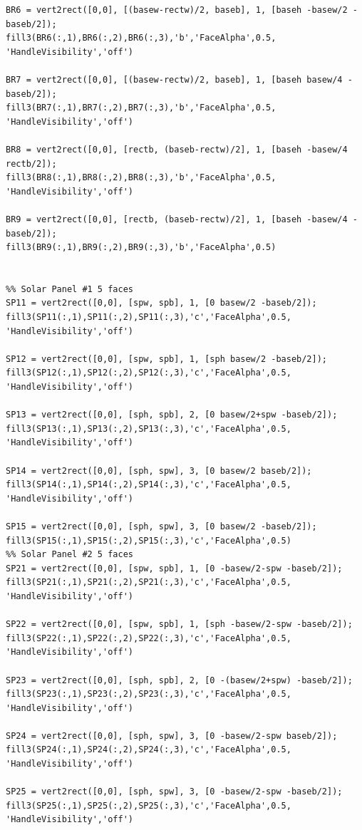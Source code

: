 \documentclass[12pt,a4paper,notitlepage]{article}
\begin{document}
\begin{lstlisting}
BR6 = vert2rect([0,0], [(basew-rectw)/2, baseb], 1, [baseh -basew/2 -baseb/2]);
fill3(BR6(:,1),BR6(:,2),BR6(:,3),'b','FaceAlpha',0.5,
'HandleVisibility','off')

BR7 = vert2rect([0,0], [(basew-rectw)/2, baseb], 1, [baseh basew/4 -baseb/2]);
fill3(BR7(:,1),BR7(:,2),BR7(:,3),'b','FaceAlpha',0.5,
'HandleVisibility','off')

BR8 = vert2rect([0,0], [rectb, (baseb-rectw)/2], 1, [baseh -basew/4 rectb/2]);
fill3(BR8(:,1),BR8(:,2),BR8(:,3),'b','FaceAlpha',0.5,
'HandleVisibility','off')

BR9 = vert2rect([0,0], [rectb, (baseb-rectw)/2], 1, [baseh -basew/4 -baseb/2]);
fill3(BR9(:,1),BR9(:,2),BR9(:,3),'b','FaceAlpha',0.5)


%% Solar Panel #1 5 faces
SP11 = vert2rect([0,0], [spw, spb], 1, [0 basew/2 -baseb/2]);
fill3(SP11(:,1),SP11(:,2),SP11(:,3),'c','FaceAlpha',0.5,
'HandleVisibility','off')

SP12 = vert2rect([0,0], [spw, spb], 1, [sph basew/2 -baseb/2]);
fill3(SP12(:,1),SP12(:,2),SP12(:,3),'c','FaceAlpha',0.5,
'HandleVisibility','off')

SP13 = vert2rect([0,0], [sph, spb], 2, [0 basew/2+spw -baseb/2]);
fill3(SP13(:,1),SP13(:,2),SP13(:,3),'c','FaceAlpha',0.5,
'HandleVisibility','off')

SP14 = vert2rect([0,0], [sph, spw], 3, [0 basew/2 baseb/2]);
fill3(SP14(:,1),SP14(:,2),SP14(:,3),'c','FaceAlpha',0.5,
'HandleVisibility','off')

SP15 = vert2rect([0,0], [sph, spw], 3, [0 basew/2 -baseb/2]);
fill3(SP15(:,1),SP15(:,2),SP15(:,3),'c','FaceAlpha',0.5)
%% Solar Panel #2 5 faces
SP21 = vert2rect([0,0], [spw, spb], 1, [0 -basew/2-spw -baseb/2]);
fill3(SP21(:,1),SP21(:,2),SP21(:,3),'c','FaceAlpha',0.5,
'HandleVisibility','off')

SP22 = vert2rect([0,0], [spw, spb], 1, [sph -basew/2-spw -baseb/2]);
fill3(SP22(:,1),SP22(:,2),SP22(:,3),'c','FaceAlpha',0.5,
'HandleVisibility','off')

SP23 = vert2rect([0,0], [sph, spb], 2, [0 -(basew/2+spw) -baseb/2]);
fill3(SP23(:,1),SP23(:,2),SP23(:,3),'c','FaceAlpha',0.5,
'HandleVisibility','off')

SP24 = vert2rect([0,0], [sph, spw], 3, [0 -basew/2-spw baseb/2]);
fill3(SP24(:,1),SP24(:,2),SP24(:,3),'c','FaceAlpha',0.5,
'HandleVisibility','off')

SP25 = vert2rect([0,0], [sph, spw], 3, [0 -basew/2-spw -baseb/2]);
fill3(SP25(:,1),SP25(:,2),SP25(:,3),'c','FaceAlpha',0.5,
'HandleVisibility','off')


\end{lstlisting}
\end{document}
